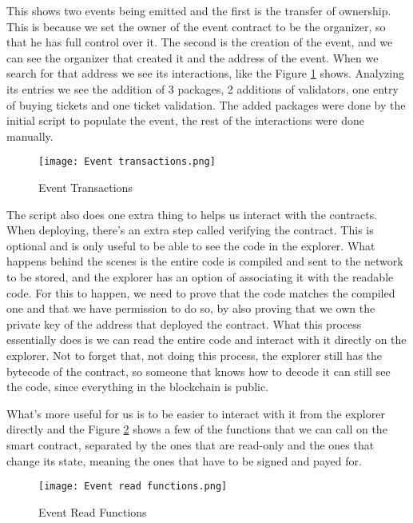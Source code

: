 This shows two events being emitted and the first is the transfer of ownership. This is because we set the owner of the event contract to be the organizer, so that he has full control over it. The second is the creation of the event, and we can see the organizer that created it and the address of the event. When we search for that address we see its interactions, like the Figure \ref{fig:event_transactions} shows. Analyzing its entries we see the addition of 3 packages, 2 additions of validators, one entry of buying tickets and one ticket validation. The added packages were done by the initial script to populate the event, the rest of the interactions were done manually.

\begin{figure}[H]
    \texttt{[image: Event transactions.png]}
    \centering
    \caption{Event Transactions}
    \label{fig:event_transactions}
\end{figure}


The script also does one extra thing to helps us interact with the contracts. When deploying, there's an extra step called verifying the contract. This is optional and is only useful to be able to see the code in the explorer. What happens behind the scenes is the entire code is compiled and sent to the network to be stored, and the explorer has an option of associating it with the readable code. For this to happen, we need to prove that the code matches the compiled one and that we have permission to do so, by also proving that we own the private key of the address that deployed the contract. What this process essentially does is we can read the entire code and interact with it directly on the explorer. Not to forget that, not doing this process, the explorer still has the bytecode of the contract, so someone that knows how to decode it can still see the code, since everything in the blockchain is public.

What's more useful for us is to be easier to interact with it from the explorer directly and the Figure \ref{fig:event_read_functions} shows a few of the functions that we can call on the smart contract, separated by the ones that are read-only and the ones that change its state, meaning the ones that have to be signed and payed for.

\begin{figure}[H]
    \texttt{[image: Event read functions.png]}
    \centering
    \caption{Event Read Functions}
    \label{fig:event_read_functions}
\end{figure}

